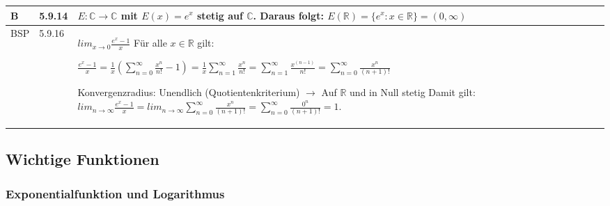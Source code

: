 \begin{longtable}{p{0.75cm} p{1cm} p{16cm}}
        \midrule
        B   & 5.9.14&   $E: \mathbb{C} \rightarrow \mathbb{C}$ mit $E(x) = e^x$ stetig auf $\mathbb{C}$. \hfill \break
                        Daraus folgt: $E(\mathbb{R}) = \{e^x: x \in \mathbb{R}\} = (0, \infty)$ \\ 
        \midrule
        BSP & 5.9.16&   $lim_{x \rightarrow 0} \frac{e^x -1}{x}$ \hfill \break
                        Für alle $x \in \mathbb{R}$ gilt: \hfill \break
                        \centerline{$\frac{e^x-1}{x} = \frac{1}{x} (\sum^{\infty}_{n=0} \frac{x^n}{n!}-1) = \frac{1}{x} \sum^{\infty}_{n=1} \frac{x^n}{n!}
                        = \sum^{\infty}_{n=1} \frac{x^(n-1)}{n!} = \sum^{\infty}_{n=0} \frac{x^n}{(n+1)!}$} 
                        Konvergenzradius: Unendlich (Quotientenkriterium) $\rightarrow$ Auf $\mathbb{R}$ und in Null stetig \hfill \break
                        Damit gilt: $lim_{n \rightarrow \infty} \frac{e^x-1}{x} = lim_{n \rightarrow \infty} \sum^{\infty}_{n=0} \frac{x^n}{(n+1)!} =
                        \sum^{\infty}_{n=0} \frac{0^n}{(n+1)!} = 1$. \\
        \bottomrule
        

    \end{longtable}

\subsection{Wichtige Funktionen}
\subsubsection{Exponentialfunktion und Logarithmus}

